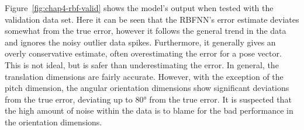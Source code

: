 Figure~\ref{fig:chap4-rbf-valid} shows the model's output when tested with the validation data set. Here it can be seen that the RBFNN's error estimate deviates somewhat from the true error, however it follows the general trend in the data and ignores the noisy outlier data spikes. Furthermore, it generally gives an overly conservative estimate, often overestimating the error for a pose vector. This is not ideal, but is safer than underestimating the error. In general, the translation dimensions are fairly accurate. However, with the exception of the pitch dimension, the angular orientation dimensions show significant deviations from the true error, deviating up to $\ang{80}$ from the true error. It is suspected that the high amount of noise within the data is to blame for the bad performance in the orientation dimensions. 

